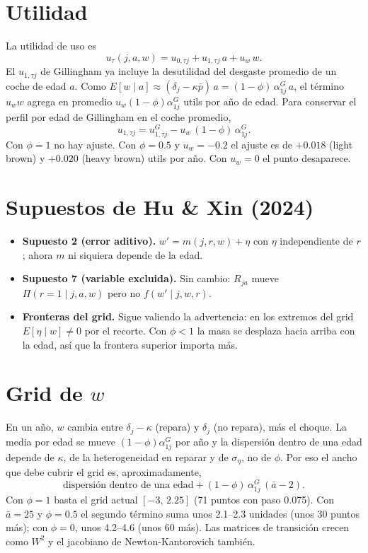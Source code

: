 \documentclass{article}
\begin{document}
\section{Utilidad}

La utilidad de uso es
$$u_\tau(j,a,w)=u_{0,\tau j}+u_{1,\tau j}\,a+u_w\,w .$$
El $u_{1,\tau j}$ de Gillingham ya incluye la desutilidad del desgaste promedio de un coche de edad $a$. Como $E[w\mid a]\approx(\delta_j-\kappa\bar{p})\,a=(1-\phi)\,\alpha^G_{1j}\,a$, el término $u_w w$ agrega en promedio $u_w(1-\phi)\alpha^G_{1j}$ utils por año de edad. Para conservar el perfil por edad de Gillingham en el coche promedio,
$$u_{1,\tau j}=u^G_{1,\tau j}-u_w\,(1-\phi)\,\alpha^G_{1j}.$$
Con $\phi=1$ no hay ajuste. Con $\phi=0.5$ y $u_w=-0.2$ el ajuste es de $+0.018$ (light brown) y $+0.020$ (heavy brown) utils por año. Con $u_w=0$ el punto desaparece.

\section{Supuestos de Hu \& Xin (2024)}

\begin{itemize}
    \item \textbf{Supuesto 2 (error aditivo).} $w'=m(j,r,w)+\eta$ con $\eta$ independiente de $r$; ahora $m$ ni siquiera depende de la edad.
    \item \textbf{Supuesto 7 (variable excluida).} Sin cambio: $R_{ja}$ mueve $\Pi(r=1\mid j,a,w)$ pero no $f(w'\mid j,w,r)$.
    \item \textbf{Fronteras del grid.} Sigue valiendo la advertencia: en los extremos del grid $E[\eta\mid w]\ne0$ por el recorte. Con $\phi<1$ la masa se desplaza hacia arriba con la edad, así que la frontera superior importa más.
\end{itemize}

\section{Grid de $w$}

En un año, $w$ cambia entre $\delta_j-\kappa$ (repara) y $\delta_j$ (no repara), más el choque. La media por edad se mueve $(1-\phi)\alpha^G_{1j}$ por año y la dispersión dentro de una edad depende de $\kappa$, de la heterogeneidad en reparar y de $\sigma_\eta$, no de $\phi$. Por eso el ancho que debe cubrir el grid es, aproximadamente,
$$\text{dispersión dentro de una edad}+(1-\phi)\,\alpha^G_{1j}\,(\bar{a}-2).$$
Con $\phi=1$ basta el grid actual $[-3,\,2.25]$ (71 puntos con paso 0.075). Con $\bar{a}=25$ y $\phi=0.5$ el segundo término suma unos 2.1--2.3 unidades (unos 30 puntos más); con $\phi=0$, unos 4.2--4.6 (unos 60 más). Las matrices de transición crecen como $W^2$ y el jacobiano de Newton-Kantorovich también.
\end{document}
